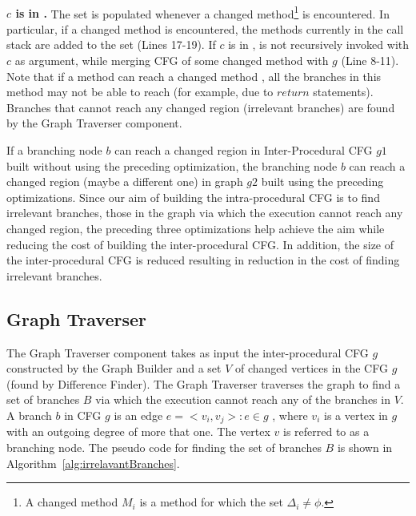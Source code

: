 \\ \textbf{ $c$ is in .} The set  is populated whenever a changed method\footnote{\scriptsize{A changed method $M_i$ is a method for which the set $\Delta_i \neq \phi $.}} is encountered. In particular, if a changed method is encountered, the methods currently in the call stack are added to the set   (Lines 17-19). If $c$ is in ,  is not recursively invoked with $c$ as argument, while merging CFG of some changed method with $g$ (Line 8-11).
Note that if a method  can reach a changed method , all the branches in this method  may not be able to reach  (for example, due to $return$ statements). Branches that cannot reach any changed region (irrelevant branches) are found by the Graph Traverser component.  

If a branching node $b$ can reach a changed region in Inter-Procedural CFG $g1$ built without using the preceding optimization, the branching node $b$ can reach a changed region (maybe a different one) in graph $g2$ built using the preceding optimizations. 
Since our aim of building the intra-procedural CFG is to find irrelevant branches, those in the graph via which the execution cannot reach any changed region, the preceding three optimizations help achieve the aim while reducing the cost of building the inter-procedural CFG. In addition, the size of the inter-procedural CFG is reduced resulting in reduction in the cost of finding irrelevant branches.

\subsection{Graph Traverser}
The Graph Traverser component takes as input the inter-procedural CFG $g$ constructed by the Graph Builder and a set $V$ of changed vertices in the CFG $g$ (found by Difference Finder). The Graph Traverser traverses the graph to find a set of branches $B$ via which the execution cannot reach any of the branches in $V$. A branch $b$ in CFG $g$ is an edge $e = <v_i, v_j>: e \in g$ , where $v_i$ is a vertex in $g$ with an outgoing degree of more that one. The vertex $v$ is referred to as a branching node. The pseudo code for finding the set of branches $B$ is shown in Algorithm~\ref{alg:irrelavantBranches}.

